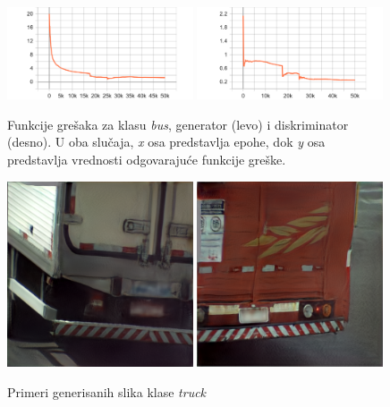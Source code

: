 \documentclass[12pt,oneside]{memoir}
\begin{document}
\begin{figure}[!htbp]
\centering
  \includegraphics[width=0.49\textwidth]{matfmaster/stylegan/bus/g_loss.png}
  \includegraphics[width=0.49\textwidth]{matfmaster/stylegan/bus/d_loss.png}
\caption{Funkcije grešaka za klasu \textit{bus}, generator (levo) i diskriminator (desno). U oba slučaja, \textit{x} osa predstavlja epohe, dok \textit{y} osa predstavlja vrednosti odgovarajuće funkcije greške.}\label{fig:section4_stylegan_bus_loss}
\end{figure}


\begin{figure}[!htbp]
\centering
    \includegraphics[width=0.49\textwidth]{matfmaster/stylegan/truck/image0.png}
    \includegraphics[width=0.49\textwidth]{matfmaster/stylegan/truck/image6.png}
\caption{Primeri generisanih slika klase \textit{truck}}
\label{fig:section4_stylegan_truck_images}
\end{figure}
\end{document}
